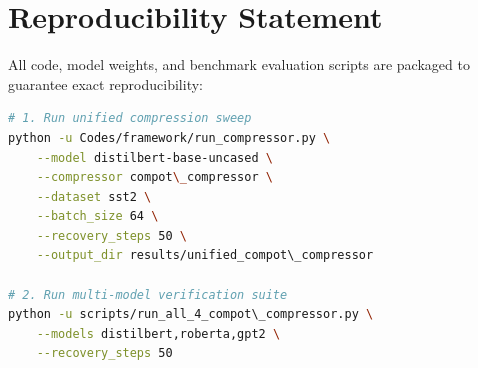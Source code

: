 \section{Reproducibility Statement}
All code, model weights, and benchmark evaluation scripts are packaged to guarantee exact reproducibility:
\begin{lstlisting}[language=bash]
# 1. Run unified compression sweep
python -u Codes/framework/run_compressor.py \
    --model distilbert-base-uncased \
    --compressor compot\_compressor \
    --dataset sst2 \
    --batch_size 64 \
    --recovery_steps 50 \
    --output_dir results/unified_compot\_compressor

# 2. Run multi-model verification suite
python -u scripts/run_all_4_compot\_compressor.py \
    --models distilbert,roberta,gpt2 \
    --recovery_steps 50
\end{lstlisting}
